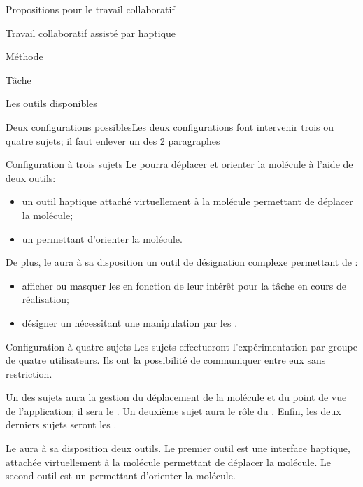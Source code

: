 \documentclass[myfrancais]{mythesis}
\begin{document}
\begin{mypart}{Propositions pour le travail collaboratif}
\begin{mychapter}{Travail collaboratif assisté par haptique}
\begin{mysection}{Méthode}
\begin{mysubsection}{Tâche}
\begin{mysubsubsection}{Les outils disponibles}
\begin{myTodo}{Deux configurations possibles}{Les deux configurations font intervenir trois ou quatre sujets; il faut enlever un des 2 paragraphes}
\begin{myparagraph}{Configuration à trois sujets}
								Le  pourra déplacer et orienter la molécule à l'aide de deux outils:
								\begin{itemize}
									\item un outil haptique attaché virtuellement à la molécule permettant de déplacer la molécule;
									\item un \mySpaceNavigator permettant d'orienter la molécule.
								\end{itemize}
								De plus, le  aura à sa disposition un outil de désignation complexe permettant de :
								\begin{itemize}
									\item afficher ou masquer les  en fonction de leur intérêt pour la tâche en cours de réalisation;
									\item désigner un  nécessitant une manipulation par les .
								\end{itemize}
							\end{myparagraph}
							\begin{myparagraph}{Configuration à quatre sujets}
								Les sujets effectueront l'expérimentation par groupe de quatre utilisateurs.
								Ils ont la possibilité de communiquer entre eux sans restriction.

								Un des sujets aura la gestion du déplacement de la molécule et du point de vue de l'application; il sera le .
								Un deuxième sujet aura le rôle du .
								Enfin, les deux derniers sujets seront les .

								Le  aura à sa disposition deux outils.
								Le premier outil est une interface haptique, attachée virtuellement à la molécule permettant de déplacer la molécule.
								Le second outil est un \mySpaceNavigator permettant d'orienter la molécule.


\end{myparagraph}
\end{myTodo}
\end{mysubsubsection}
\end{mysubsection}
\end{mysection}
\end{mychapter}
\end{mypart}
\end{document}
